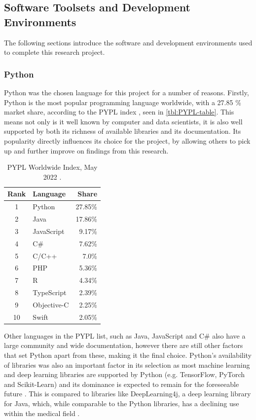 \subsection{Software Toolsets and Development Environments}
The following sections introduce the software and development environments used to complete this research project.

\subsubsection{Python}
Python was the chosen language for this project for a number of reasons. Firstly, Python is the most popular programming language worldwide, with a 27.85 \% market share, according to the PYPL index \citep{PYPLPopu3:online}, seen in \autoref{tbl:PYPL-table}. This means not only is it well known by computer and data scientists, it is also well supported by both its richness of available libraries and its documentation. Its popularity directly influences its choice for the project, by allowing others to pick up and further improve on findings from this research. 

\begin{table}[H]
    \caption{PYPL Worldwide Index, May 2022 \citep{PYPLPopu3:online}.}
    \centering
    \begin{tabular}{c|l|r}
        Rank & Language & Share \\
        \hline\hline
        1 & Python & 27.85\% \\
        2 & Java & 17.86\% \\
        3 & JavaScript & 9.17\% \\
        4 & C\# & 7.62\% \\
        5 & C/C++ & 7.0\% \\
        6 & PHP & 5.36\% \\
        7 & R & 4.34\% \\
        8 & TypeScript & 2.39\% \\
        9 & Objective-C & 2.25\% \\
        10 & Swift & 2.05\% \\
    \end{tabular}
    \label{tbl:PYPL-table}
\end{table}

Other languages in the PYPL list, such as Java, JavaScript and C\# also have a large community and wide documentation, however there are still other factors that set Python apart from these, making it the final choice. Python’s availability of libraries was also an important factor in its selection as most machine learning and deep learning libraries are supported by Python (e.g. TensorFlow, PyTorch and Scikit-Learn) and its dominance is expected to remain for the foreseeable future \citep{raschka2020machine}. This is compared to libraries like DeepLearning4j, a deep learning library for Java, which, while comparable to the Python libraries, has a declining use within the medical field \citep{erickson2017toolkits}. 

